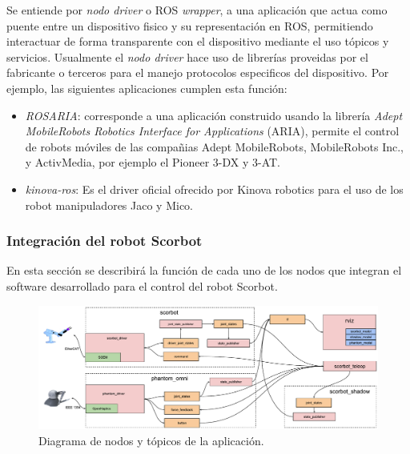 Se entiende por \textit{nodo driver} o ROS \textit{wrapper}, a una aplicación que actua como puente entre un dispositivo fisico y su representación en ROS, permitiendo interactuar de forma transparente con el dispositivo mediante el uso tópicos y servicios. Usualmente el \textit{nodo driver} hace uso de librerías proveidas por el fabricante o terceros para el manejo protocolos especificos del dispositivo. Por ejemplo, las siguientes aplicaciones cumplen esta función:

\begin{itemize}

\item \textit{ROSARIA}\cite{rosaria}: corresponde a una aplicación construido usando la librería \textit{Adept MobileRobots Robotics Interface for Applications} (ARIA), permite el control de robots móviles de las compañias Adept MobileRobots, MobileRobots Inc., y ActivMedia, por ejemplo el Pioneer 3-DX y 3-AT.

\item \textit{kinova-ros}\cite{kinova}: Es el driver oficial ofrecido por Kinova robotics para el uso de los robot manipuladores Jaco y Mico.

\end{itemize}

\subsubsection{Integración del robot Scorbot}

En esta sección se describirá la función de cada uno de los nodos que integran el software desarrollado para el control del robot Scorbot.

\begin{figure}[ht]
  \centering
  \includegraphics[width=\textwidth]{img/cap4/scorbot_software.pdf}
  \caption{Diagrama de nodos y tópicos de la aplicación.}
  \label{cap4_scorbot_software}
\end{figure}

